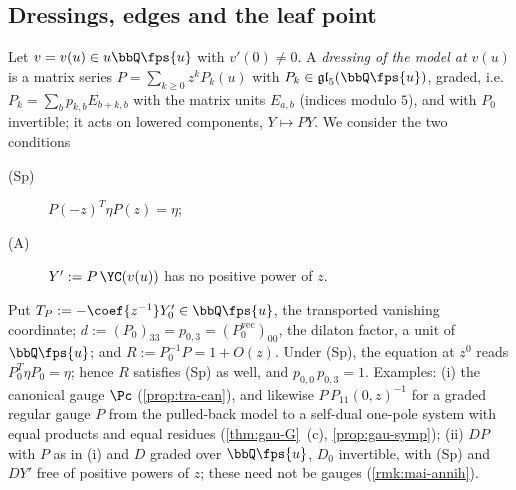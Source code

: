
\subsection{Dressings, edges and the leaf point}
\label{sec:tra-dress}

\begin{defn}[dressings]
\label{def:tra-dressing}
Let $v = v(u)\in u\bbQ\fps{u}$ with $v'(0)\neq 0$. A \emph{dressing of the model at $v(u)$} is a matrix series $P = \sum_{k\geq 0}z^kP_k(u)$ with $P_k\in\mathfrak{gl}_5(\bbQ\fps{u})$, graded, i.e.\ $P_k = \sum_bp_{k,b}E_{b+k,b}$ with the matrix units $E_{a,b}$ (indices modulo $5$), and with $P_0$ invertible; it acts on lowered components, $Y\mapsto PY$. We consider the two conditions
\begin{description}
\item[(Sp)] $P(-z)^T\eta P(z) = \eta$;
\item[(A)] $Y' := P\,\YC(v(u))$ has no positive power of $z$.
\end{description}
Put $T_P := -\coef{z^{-1}}Y'_0\in\bbQ\fps{u}$, the transported vanishing coordinate; $d := (P_0)_{33} = p_{0,3} = (P_0^{\mathrm{vec}})_{00}$, the dilaton factor, a unit of $\bbQ\fps{u}$; and $R := P_0^{-1}P = 1+O(z)$. Under (Sp), the equation at $z^0$ reads $P_0^T\eta P_0 = \eta$; hence $R$ satisfies (Sp) as well, and $p_{0,0}\,p_{0,3} = 1$. Examples: (i) the canonical gauge $\Pc$ (\cref{prop:tra-can}), and likewise $P\,P_{11}(0,z)^{-1}$ for a graded regular gauge $P$ from the pulled-back model to a self-dual one-pole system with equal products and equal residues (\cref{thm:gau-G}~(c), \cref{prop:gau-symp}); (ii) $DP$ with $P$ as in (i) and $D$ graded over $\bbQ\fps{u}$, $D_0$ invertible, with (Sp) and $DY'$ free of positive powers of $z$; these need not be gauges (\cref{rmk:mai-annih}).
\end{defn}

